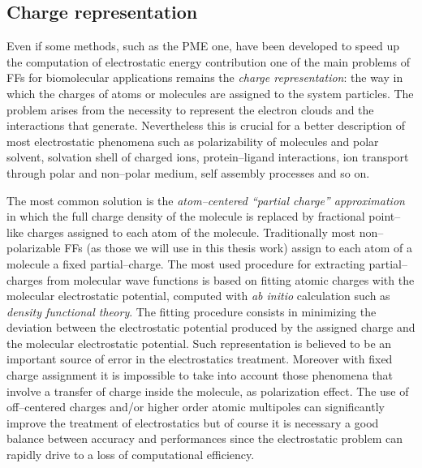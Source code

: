\subsection{Charge representation}
\label{sec:chargeRep}
Even if some methods, such as the \ac{PME} one, have been developed to speed up the computation of electrostatic 
energy contribution one of the main problems of \acp{FF} for biomolecular applications remains the \textit{charge 
representation}: the way in which the charges of atoms or molecules are assigned to the system particles. The 
problem arises from the necessity to represent the electron clouds and the interactions that generate. 
Nevertheless this is crucial for a better description of most electrostatic phenomena such as polarizability of 
molecules and polar solvent, solvation shell of charged ions, protein--ligand interactions, ion transport through 
polar and non--polar medium, self assembly processes and so on.

The most common solution is the \textit{atom--centered ``partial charge'' approximation} in which the full charge 
density of the molecule is replaced by fractional point--like charges assigned to each atom of the molecule. 
Traditionally most non--polarizable \acp{FF} (as those we will use in this thesis work) assign to each atom of a 
molecule a fixed partial--charge. The most used procedure for extracting partial--charges from molecular wave 
functions is based on fitting atomic charges with the molecular electrostatic potential, computed with \textit{ab 
initio} calculation such as \textit{density functional theory}. The fitting procedure consists in minimizing the 
deviation between the electrostatic potential produced by the assigned charge and the molecular electrostatic 
potential. Such representation is believed to be an important source of error in the electrostatics treatment. 
Moreover with fixed charge assignment it is impossible to take into account those phenomena that involve a 
transfer of charge inside the molecule, as polarization effect. The use of off--centered charges and/or higher 
order atomic multipoles can significantly improve the treatment of electrostatics but of course it is necessary a 
good balance between accuracy and performances since the electrostatic problem can rapidly drive to a loss of 
computational efficiency.

